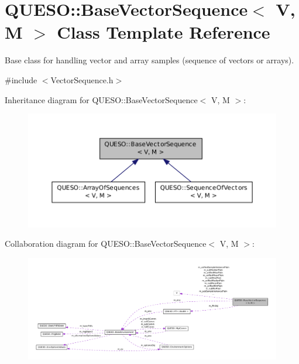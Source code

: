 \hypertarget{class_q_u_e_s_o_1_1_base_vector_sequence}{\section{Q\-U\-E\-S\-O\-:\-:Base\-Vector\-Sequence$<$ V, M $>$ Class Template Reference}
\label{class_q_u_e_s_o_1_1_base_vector_sequence}
}


Base class for handling vector and array samples (sequence of vectors or arrays).  




{\ttfamily \#include $<$Vector\-Sequence.\-h$>$}



Inheritance diagram for Q\-U\-E\-S\-O\-:\-:Base\-Vector\-Sequence$<$ V, M $>$\-:
\nopagebreak
\begin{figure}[H]
\begin{center}
\leavevmode
\includegraphics[width=350pt]{class_q_u_e_s_o_1_1_base_vector_sequence__inherit__graph}
\end{center}
\end{figure}


Collaboration diagram for Q\-U\-E\-S\-O\-:\-:Base\-Vector\-Sequence$<$ V, M $>$\-:
\nopagebreak
\begin{figure}[H]
\begin{center}
\leavevmode
\includegraphics[width=350pt]{class_q_u_e_s_o_1_1_base_vector_sequence__coll__graph}
\end{center}
\end{figure}
